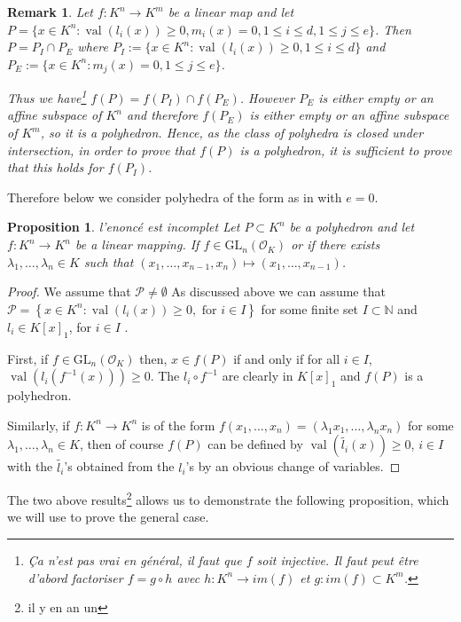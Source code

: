 \documentclass[a4paper,oneside,11pt]{article}
\newtheorem{proposition}[theorem]{Proposition}
\newtheorem{remark}[theorem]{Remark}
\newcommand{\N}{\mathbb{N}} %
\newcommand{\PP}{\mathcal{P}}
\newcommand{\simone}[1]{{\color{blue} #1}} %
\DeclareMathOperator{\val}{val}
\newcommand{\OK}{\mathcal{O}_K}
\newcommand{\GL}{\mathrm{GL}}
\begin{document}
\begin{remark}
  Let $f : K^n \to K^m$ be a linear map and let
  $P = \{x \in K^n : \val(l_i(x)) \geq 0, m_i(x) = 0, 1 \leq i \leq d, 1 \leq j \leq e\}$.
  Then $P = P_I \cap P_E$ where $P_I := \{x \in K^n : \val(l_i(x)) \geq 0, 1 \leq i \leq d\}$
  and $P_E := \{x \in K^n : m_j(x) = 0, 1 \leq j \leq e\}$.

  Thus we have\footnote{\simone{Ça n'est pas vrai en général, il faut que $f$ soit injective.
    Il faut peut être d'abord factoriser $f = g \circ h$ avec $h : K^n \to im(f)$ et
    $g : im(f) \subset K^m$.}}
  $f(P) = f(P_I) \cap f(P_E)$. However $P_E$ is either empty or an affine subspace of
  $K^n$ and therefore $f(P_E)$ is either empty or an affine subspace of $K^m$, so it is a polyhedron.
  Hence, as the class of polyhedra is closed under intersection, in order to prove that
  $f(P)$ is a polyhedron, it is sufficient to prove that this holds for $f(P_I)$.
\end{remark}

Therefore below we consider polyhedra of the form as in  with $e=0$.

\begin{proposition}\simone{l'enoncé est incomplet}
  Let $P \subset K^n$ be a polyhedron and let $f : K^n \to K^n$ be a linear mapping.
  If $f \in \GL_n(\OK)$ or if there exists $\lambda_1, \dots, \lambda_n \in K$ such that
  $(x_1,\dots,x_{n-1}, x_n) \mapsto (x_1,\dots, x_{n-1})$.
\end{proposition}

\begin{proof}
We assume that $\PP \neq \emptyset$
As discussed above we can assume that
$\PP = \left\lbrace x \in K^n : \val (l_i (x) ) \geq 0,\textrm{ for } i \in I \right\rbrace$ for some
finite set $I \subset \N$ and $l_i \in K[x]_1$, for $i \in I$ .

First, if $f \in \GL_n(\OK)$ then, $x \in f(P)$ if and only if for all $i \in I$, 
$\val(l_i (f^{-1}(x))) \geq 0$.
The $l_i \circ f^{-1}$ are clearly in $K[x]_1$
and $f(P)$ is a polyhedron.

Similarly, if $f:K^n \rightarrow K^n$ is of the form
$f(x_1,\dots,x_n)=(\lambda_1 x_1,\dots,\lambda_n x_n)$
for some $\lambda_1,\ldots, \lambda_n \in K$,
then of course $f(P)$
can be defined by $\val (\widetilde{l_i}(x)) \geq 0$, $i \in I$
with the $\widetilde{l_i}$'s obtained from the $l_i$'s by an
obvious change of variables.
\end{proof}

The two above results\footnote{\simone{il y en an un}}
allows us to demonstrate the following proposition, which we will use to prove the general case. 
\end{document}
